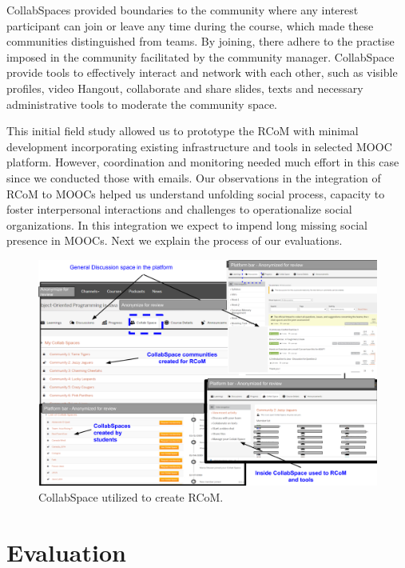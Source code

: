 \documentclass[format=acmsmall, review=false, screen=true]{acmart}
\newcommand{\msb}[1]{{\textcolor{blue}{ [Michael: #1]}}}
\begin{document}
CollabSpaces provided boundaries to the community where any interest participant can join or leave any time during the course, which made these communities distinguished from teams. By joining, there adhere to the practise imposed in the community facilitated by the community manager. CollabSpace provide tools to effectively interact and network with each other, such as visible profiles, video Hangout, collaborate and share slides, texts and necessary administrative tools to moderate the community space. 

This initial field study allowed us to prototype the RCoM with minimal development incorporating existing infrastructure and tools in selected MOOC platform. However, coordination and monitoring needed much effort in this case since we conducted those with emails. Our observations in the integration of RCoM to MOOCs helped us understand unfolding social process, capacity to foster interpersonal interactions and challenges to operationalize social organizations. In this integration we expect to impend long missing social presence in MOOCs. Next we explain the process of our evaluations. 

\begin{figure}[h]
 \centering
 \includegraphics[width=\linewidth]{images/CollabSpacedetails.png}
 \caption{CollabSpace utilized to create RCoM.}
 \label{fig:CollabSpace}
\end{figure}

\section{Evaluation}
\end{document}
